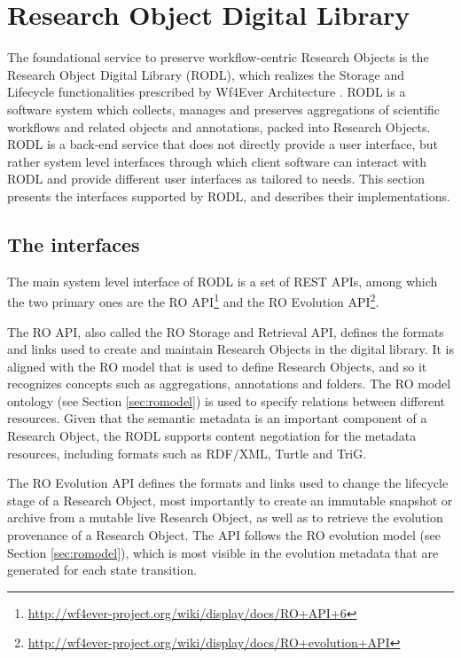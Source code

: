 \section{Research Object Digital Library}
\label{sec:rodl}


The foundational service to preserve workflow-centric Research Objects is the Research Object Digital Library (RODL), which realizes the Storage and Lifecycle functionalities prescribed by Wf4Ever Architecture \cite{w4fever_d132}. RODL is a software system which collects, manages and preserves aggregations of scientific workflows and related objects and annotations, packed into Research Objects. RODL is a back-end service that does not directly provide a user interface, but rather system level interfaces through which client software can interact with RODL and provide different user interfaces as tailored to needs. This section presents the interfaces supported by RODL, and describes their implementations.

\subsection{The interfaces}

The main system level interface of RODL is a set of REST APIs, among which the two primary ones are the RO API\footnote{\url{http://wf4ever-project.org/wiki/display/docs/RO+API+6}} and the RO Evolution API\footnote{\url{http://wf4ever-project.org/wiki/display/docs/RO+evolution+API}}.

The RO API, also called the RO Storage and Retrieval API, defines the formats and links used to create and maintain Research Objects in the digital library. It is aligned with the RO model that is used to define Research Objects, and so it recognizes concepts such as aggregations, annotations and folders. The RO model ontology (see Section \ref{sec:romodel}) is used to specify relations between different resources. Given that the semantic metadata is an important component of a Research Object, the RODL supports content negotiation for the metadata resources, including formats such as RDF/XML, Turtle and TriG.

The RO Evolution API defines the formats and links used to change the lifecycle stage of a Research Object, most importantly to create an immutable snapshot or archive from a mutable live Research Object, as well as to retrieve the evolution provenance of a Research Object. The API follows the RO evolution model (see Section \ref{sec:romodel}), which is most visible in the evolution metadata that are generated for each state transition.

